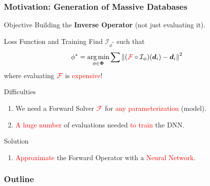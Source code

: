 \documentclass[10pt,aspectratio=149]{beamer}
\begin{document}
\begin{frame}
    \frametitle{Motivation: Generation of Massive Databases}    
\vspace{-2mm}

\begin{block}{Objective}
	\centering
	Building the \textbf{Inverse Operator} (not just evaluating it).
\end{block}

\begin{block}{Loss Function and Training}
Find $\mathcal{I}_{\phi^*}$ such that
\[
\phi^* = \operatorname*{arg\,min}_{\phi \in \boldsymbol{\Phi}} \sum \left\| (\textcolor{red}{\mathcal{F}} \circ \mathcal{I}_{\phi})(\boldsymbol{d}_i) - \boldsymbol{d}_i \right\|^2
\]
where evaluating $\textcolor{red}{\mathcal{F}}$ is \textcolor{red}{expensive}!
\end{block}
    
\begin{block}{Difficulties}
    \begin{enumerate}
        \item We need a Forward Solver \textcolor{red}{$\mathcal{F}$} for \textcolor{red}{any parameterization} (model).
        \item \textcolor{red}{A huge number} of evaluations needed \textcolor{red}{to train} the DNN.
    \end{enumerate}
\end{block}

\begin{block}{Solution}
    \begin{enumerate}
        \item  \textcolor{red}{Approximate} the Forward Operator with a  \textcolor{red}{Neural Network}.
    \end{enumerate}
\end{block}

\end{frame}
\begin{frame}
	\frametitle{Outline}
	\tableofcontents
\end{frame}
\end{document}
